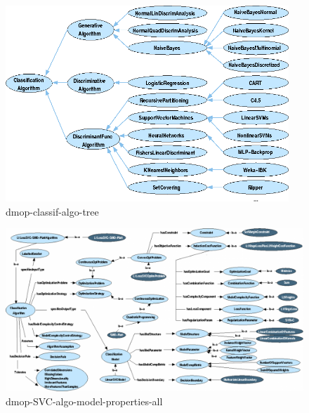 \documentclass[a4paper,12pt, english]{article}
\begin{document}
\begin{figure}[h]   
  \centering 
  \includegraphics[width=0.95\textwidth]{figs/dmop-classif-algo-tree}
  \caption{dmop-classif-algo-tree}
  \label{fig:dmop-classif-algo-tree}
\end{figure}


\newpage
\begin{figure}[h]
  \centering
  \includegraphics[height=0.45\textheight, angle=90]{figs/dmop-SVC-algo-model-properties-all}
  \caption{dmop-SVC-algo-model-properties-all}
  \label{fig:dmop-classif-algo-tree}
\end{figure}
\end{document}
